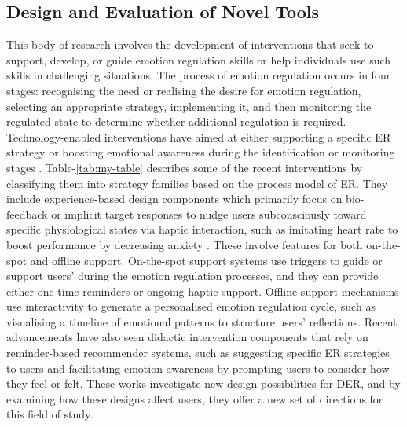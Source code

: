 \documentclass[lettersize,journal]{IEEEtran}
\begin{document}
\subsection{Design and Evaluation of Novel Tools}
This body of research involves the development of interventions that seek to support, develop, or guide emotion regulation skills or help individuals use such skills in challenging situations. The process of emotion regulation occurs in four stages: recognising the need or realising the desire for emotion regulation, selecting an appropriate strategy, implementing it, and then monitoring the regulated state to determine whether additional regulation is required. Technology-enabled interventions have aimed at either supporting a specific ER strategy or boosting emotional awareness during the identification or monitoring stages \cite{slovak2022designing}. Table-\ref{tab:my-table} describes some of the recent interventions by classifying them into strategy families based on the process model of ER. They include experience-based design components which primarily focus on bio-feedback or implicit target responses to nudge users subconsciously toward specific physiological states via haptic interaction, such as imitating heart rate to boost performance by decreasing anxiety \cite{smith2022digital}. These involve features for both on-the-spot and offline support. On-the-spot support systems use triggers to guide or support users' during the emotion regulation processes, and they can provide either one-time reminders or ongoing haptic support. Offline support mechanisms use interactivity to generate a personalised emotion regulation cycle, such as visualising a timeline of emotional patterns to structure users' reflections. Recent advancements have also seen didactic intervention components that rely on reminder-based recommender systems, such as suggesting specific ER strategies to users and facilitating emotion awareness by prompting users to consider how they feel or felt. These works investigate new design possibilities for DER, and by examining how these designs affect users, they offer a new set of directions for this field of study.
\end{document}
